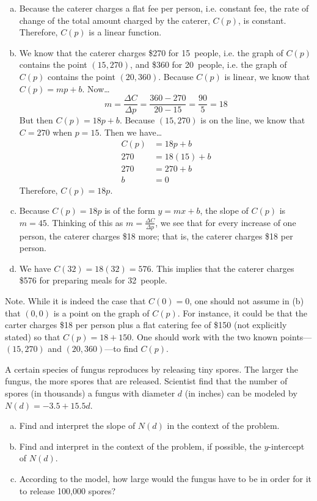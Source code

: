 \documentclass[12pt,letterpaper]{exam}
\begin{document}
\begin{questions}
{\itshape
\begin{enumerate}[(a)]
\item Because the caterer charges a flat fee per person, i.e. constant fee, the rate of change of the total amount charged by the caterer, $C(p)$, is constant. Therefore, $C(p)$ is a linear function. \pspace

\item We know that the caterer charges \$270 for 15~people, i.e. the graph of $C(p)$ contains the point $(15, 270)$, and \$360 for 20~people, i.e. the graph of $C(p)$ contains the point $(20, 360)$. Because $C(p)$ is linear, we know that $C(p)= mp + b$. Now\dots
	\[
	m= \dfrac{\Delta C}{\Delta p}= \dfrac{360 - 270}{20 - 15}= \dfrac{90}{5}= 18
	\]
But then $C(p)= 18p + b$. Because $(15, 270)$ is on the line, we know that $C= 270$ when $p= 15$. Then we have\dots
	\[
	\begin{aligned}
	C(p)&= 18p + b \\[0.3cm]
	270&= 18(15) + b \\[0.3cm]
	270&= 270 + b \\[0.3cm]
	b&= 0
	\end{aligned}
	\]
Therefore, $C(p)= 18p$. \pspace

\item Because $C(p)= 18p$ is of the form $y= mx + b$, the slope of $C(p)$ is $m= 45$. Thinking of this as $m= \frac{\Delta C}{\Delta p}$, we see that for every increase of one person, the caterer charges \$18 more; that is, the caterer charges \$18 per person. \pspace

\item We have $C(32)= 18(32)= 576$. This implies that the caterer charges \$576 for preparing meals for 32~people. 
\end{enumerate} \pspace

\vfill Note. While it is indeed the case that $C(0)= 0$, one should not assume in (b) that $(0, 0)$ is a point on the graph of $C(p)$. For instance, it could be that the carter charges \$18 per person plus a flat catering fee of \$150 (not explicitly stated) so that $C(p)= 18 + 150$. One should work with the two known points---$(15, 270)$ and $(20, 360)$---to find $C(p)$. 
}



\newpage
\question[10] A certain species of fungus reproduces by releasing tiny spores. The larger the fungus, the more spores that are released. Scientist find that the number of spores (in thousands) a fungus with diameter $d$ (in inches) can be modeled by $N(d)= -3.5 + 15.5d$.
	\begin{enumerate}[(a)]
	\item Find and interpret the slope of $N(d)$ in the context of the problem.
	\item Find and interpret in the context of the problem, if possible, the $y$-intercept of $N(d)$.
	\item According to the model, how large would the fungus have to be in order for it to release 100,000 spores?
	\end{enumerate} \pspace


\end{questions}
\end{document}
